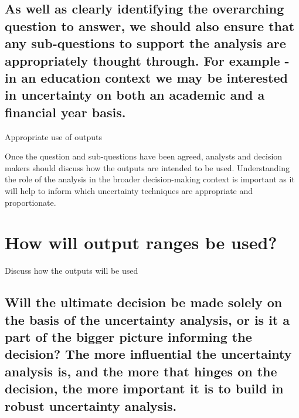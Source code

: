\documentclass[]{book}
\begin{document}
\subsection{As well as clearly identifying the overarching question to
answer, we should also ensure that any sub-questions to support the
analysis are appropriately thought through. For example - in an
education context we may be interested in uncertainty on both an
academic and a financial year
basis.}\label{as-well-as-clearly-identifying-the-overarching-question-to-answer-we-should-also-ensure-that-any-sub-questions-to-support-the-analysis-are-appropriately-thought-through.-for-example---in-an-education-context-we-may-be-interested-in-uncertainty-on-both-an-academic-and-a-financial-year-basis.}

Appropriate use of outputs

 Once the question and sub-questions have been agreed, analysts and
decision makers should discuss how the outputs are intended to be used.
Understanding the role of the analysis in the broader decision-making
context is important as it will help to inform which uncertainty
techniques are appropriate and proportionate.

\section{How will output ranges be
used?}\label{how-will-output-ranges-be-used}

 Discuss how the outputs will be used

\subsection{Will the ultimate decision be made solely on the basis of
the uncertainty analysis, or is it a part of the bigger picture
informing the decision? The more influential the uncertainty analysis
is, and the more that hinges on the decision, the more important it is
to build in robust uncertainty
analysis.}\label{will-the-ultimate-decision-be-made-solely-on-the-basis-of-the-uncertainty-analysis-or-is-it-a-part-of-the-bigger-picture-informing-the-decision-the-more-influential-the-uncertainty-analysis-is-and-the-more-that-hinges-on-the-decision-the-more-important-it-is-to-build-in-robust-uncertainty-analysis.}
\end{document}
